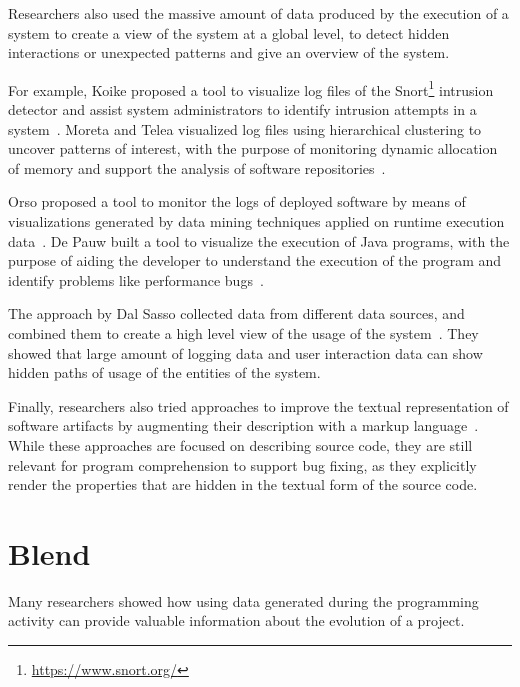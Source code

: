 Researchers also used the massive amount of data produced by the execution of a system to create a view of the system at a global level, to detect hidden interactions or unexpected patterns and give an overview of the system.

For example, Koike proposed a tool to visualize log files of the Snort\footnote{\url{https://www.snort.org/}} intrusion detector and assist system administrators to identify intrusion attempts in a system~\cite{Koik2004}.
Moreta and Telea visualized log files using hierarchical clustering to uncover patterns of interest, with the purpose of monitoring dynamic allocation of memory and support the analysis of software repositories~\cite{More2007}.

Orso \etal proposed a tool to monitor the logs of deployed software by means of visualizations generated by data mining techniques applied on runtime execution data~\cite{Orso2003}.
De Pauw \etal built a tool to visualize the execution of Java programs, with the purpose of aiding the developer to understand the execution of the program and identify problems like performance bugs~\cite{De2002}.

The approach by Dal Sasso \etal collected data from different data sources, and combined them to create a high level view of the usage of the system~\cite{DalS2015b}.
They showed that large amount of logging data and user interaction data can show hidden paths of usage of the entities of the system.

Finally, researchers also tried approaches to improve the textual representation of software artifacts by augmenting their description with a markup language~\cite{Badr2000,Male2002a}.
While these approaches are focused on describing source code, they are still relevant for program comprehension to support bug fixing, as they explicitly render the properties that are hidden in the textual form of the source code.




\section{Blend}\label{sec:related-blend}

Many researchers showed how using data generated during the programming activity can provide valuable information about the evolution of a project.

